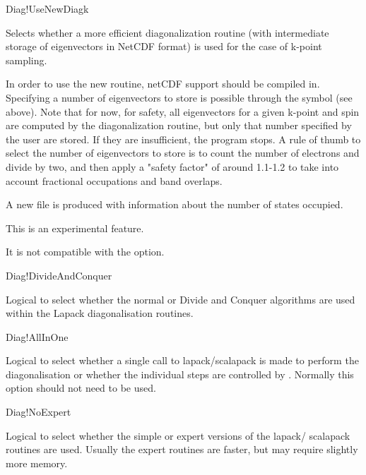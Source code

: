 \begin{fdflogicalF}{Diag!UseNewDiagk}

  Selects whether a more efficient diagonalization routine (with
  intermediate storage of eigenvectors in NetCDF format) is used for
  the case of k-point sampling.

  In order to use the new routine, netCDF support should be compiled
  in.  Specifying a number of eigenvectors to store is possible
  through the symbol  (see above). Note that for
  now, for safety, all eigenvectors for a given k-point and spin are
  computed by the diagonalization routine, but only that number
  specified by the user are stored. If they are insufficient, the
  program stops.  A rule of thumb to select the number of eigenvectors
  to store is to count the number of electrons and divide by two, and
  then apply a "safety factor" of around 1.1-1.2 to take into account
  fractional occupations and band overlaps.

  A new file  is produced with information about the number
  of states occupied.

  This is an experimental feature. 

  \note It is not compatible with the 
  option.

\end{fdflogicalF}


\begin{fdflogicalT}{Diag!DivideAndConquer}

  Logical to select whether the normal or Divide and Conquer
  algorithms are used within the Lapack diagonalisation routines.

\end{fdflogicalT}

\begin{fdflogicalF}{Diag!AllInOne}

  Logical to select whether a single call to lapack/scalapack is made
  to perform the diagonalisation or whether the individual steps are
  controlled by \siesta. Normally this option should not need to be
  used.
  
\end{fdflogicalF}

\begin{fdflogicalF}{Diag!NoExpert}

  Logical to select whether the simple or expert versions of the
  lapack/ scalapack routines are used. Usually the expert routines are
  faster, but may require slightly more memory.

\end{fdflogicalF}

